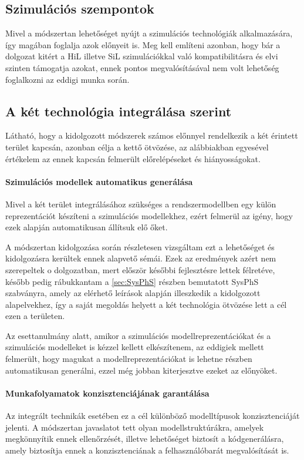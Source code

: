         \subsection{Szimulációs szempontok}
        Mivel a módszertan lehetőséget nyújt a szimulációs technológiák alkalmazására, így magában foglalja azok előnyeit is.
        Meg kell említeni azonban, hogy bár a dolgozat kitért a HiL illetve SiL szimulációkkal való kompatibilitásra és elvi szinten támogatja azokat, ennek pontos megvalósításával nem volt lehetőség foglalkozni az eddigi munka során.

        \subsection{A két technológia integrálása szerint}
        Látható, hogy a kidolgozott módszerek számos előnnyel rendelkezik a két érintett terület kapcsán, azonban célja a kettő ötvözése, az alábbiakban egyesével értékelem az ennek kapcsán felmerült előrelépéseket és hiányosságokat.

            \paragraph{Szimulációs modellek automatikus generálása}
            Mivel a két terület integrálásához szükséges a rendszermodellben egy külön reprezentációt készíteni a szimulációs modellekhez, ezért felmerül az igény, hogy ezek alapján automatikusan állítsuk elő őket.
            
            A módszertan kidolgozása során részletesen vizsgáltam ezt a lehetőséget és kidolgozásra kerültek ennek alapvető sémái. Ezek az eredmények azért nem szerepeltek o dolgozatban, mert először későbbi fejlesztésre lettek félretéve, később pedig rábukkantam a \ref{sec:SysPhS} részben bemutatott SysPhS
            szabványra, amely az elérhető leírások alapján illeszkedik a kidolgozott alapelvekhez, így a saját megoldás helyett a két technológia ötvözése lett a cél ezen a területen.
            
            Az esettanulmány alatt, amikor a szimulációs modellreprezentációkat és a szimulációs modelleket is kézzel kellett elkészítenem, az eddigiek mellett felmerült, hogy magukat a modellreprezentációkat is lehetne részben automatikusan generálni, ezzel még jobban kiterjesztve ezeket az előnyöket.

            \paragraph{Munkafolyamatok konzisztenciájának garantálása}
            Az integrált technikák esetében ez a cél különböző modelltípusok konzisztenciáját jelenti. A módszertan javaslatot tett olyan modellstruktúrákra, amelyek megkönnyítik ennek ellenőrzését, illetve lehetőséget biztosít a kódgenerálásra, amely biztosítja ennek a konzisztenciának a felhasználóbarát megvalósítását is.
            
